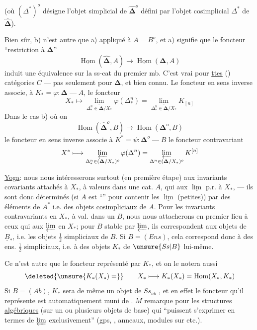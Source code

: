 (où $(\Delta^*)^o$ désigne l'objet simplicial de $\widehat{\boldsymbol\Delta}^{o}$
défini par l'objet cosimplicial $\Delta^*$ de $\widehat{\boldsymbol\Delta}$).

Bien sûr, b) n'est autre que a) appliqué à $A=B^o$, et a) signifie que
le foncteur ``restriction à $\boldsymbol\Delta$''
\[
 \underline{\operatorname{Hom}}(\widehat{\boldsymbol\Delta},A)
 \longrightarrow\underline{\operatorname{Hom}}(\boldsymbol\Delta,A)
\]
induit une équivalence sur la ss-cat
du premier mb. C'est vrai pour \uline{ttes}
() catégories $C$ ---
pas seulement pour $\boldsymbol\Delta$, et bien connu.
Le foncteur en sens inverse associe, à
$K_*=\varphi:\boldsymbol\Delta\mathbin{\text{---}}A$, le foncteur
\[
 X_*\longmapsto
 \underset{\Delta^n_*\in\boldsymbol\Delta/X_*}{\underline{\lim}}
 \varphi(\Delta^n_*)=
 \underset{\Delta^n_*\in\boldsymbol\Delta/X_*}{\underline{\lim}}K_{[n]}
\]
Dans le cas b) où on 
\[
 \underline{\operatorname{Hom}}(\widehat{\boldsymbol\Delta}^{o},B)
 \longrightarrow\underline{\operatorname{Hom}}(\boldsymbol\Delta^{o},B)
\]
le foncteur en sens inverse associe à
$K^*=\psi:\boldsymbol\Delta^o\mathbin{\text{---}}B$
le foncteur contravariant
\[
 X^*\longmapsto
 \varprojlim_{\Delta^n_*\in(\boldsymbol\Delta/X_*)^o}\varphi(\Delta^n)
 =\varprojlim_{\Delta^n\in(\boldsymbol\Delta/X_*)^o}K^{[n]}
\]

\uline{Yoga}: nous nous intéresserons surtout
 (en première étape) aux invariants covariants attachés à $X_*$,
à valeurs dans une cat. $A$, qui 
aux $\underline{\lim}$ p.r. à $X_*$, --- ils sont donc déterminés
(si $A$ est ``\uline{}'' pour contenir les $\underline{\lim}$
(petites)) par des éléments de $A^*$ i.e. des objets \uline{cosimpliciaux} de $A$.
Pour les invariants contravariants en $X_*$, à val. dans un $B$, nous nous
attacherons en premier lieu à ceux qui  aux $\varprojlim$
en $X_*$; pour $B$ stable par $\varprojlim$, ils correspondent
 aux objets de $\underline B_*$, i.e. les objets
$\tfrac12$ simpliciaux de $B$. Si $B=(Ens)$, cela correspond donc à des
ens. $\tfrac12$ simpliciaux, i.e. à des objets $K_*$ de
$\unsure{Ss|B}$ lui-même.

Ce n'est autre que le foncteur représenté par $K_*$, et on le notera aussi
\[
 \deleted{\unsure{K_*(X_*)=}}
 \qquad X_*\longmapsto K_*(X_*)=\operatorname{Hom}(X_*,K_*)
\]
Si $B=(Ab)$, $K_*$ sera de même un objet de $Ss_{ab}$
, et en effet le foncteur qu'il représente est
automatiquement muni de 
. $\overline M$ remarque pour les structures
\uline{algébriques} (sur un ou plusieurs objets de base) qui
``puissent s'exprimer en termes de $\varprojlim$ exclusivement''
(gps, , anneaux, modules sur
 etc.).

